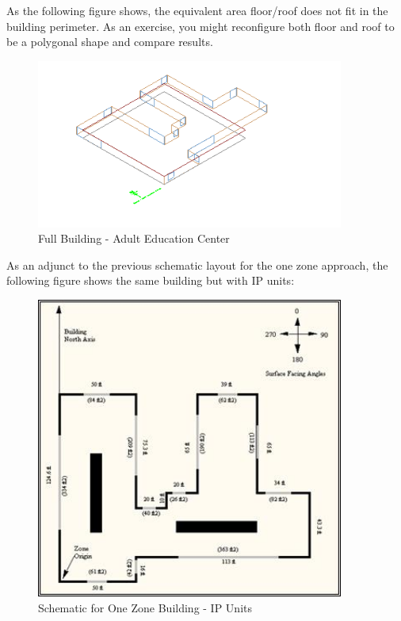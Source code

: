 As the following figure shows, the equivalent area floor/roof does not fit in the building perimeter. As an exercise, you might reconfigure both floor and roof to be a polygonal shape and compare results.

\begin{figure}[hbtp] %
\centering
\includegraphics[width=0.9\textwidth, height=0.9\textheight, keepaspectratio=true]{media/image018.png}
\caption{Full Building - Adult Education Center \protect \label{fig:full-building-adult-education-center}}
\end{figure}

As an adjunct to the previous schematic layout for the one zone approach, the following figure shows the same building but with IP units:

\begin{figure}[hbtp] %
\centering
\includegraphics[width=0.9\textwidth, height=0.9\textheight, keepaspectratio=true]{media/image019.jpg}
\caption{Schematic for One Zone Building - IP Units \protect \label{fig:schematic-for-one-zone-building-ip-units}}
\end{figure}
